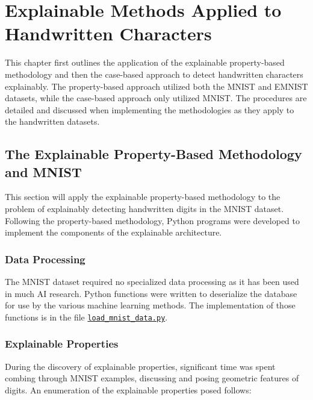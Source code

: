 \chapter{Explainable Methods Applied to Handwritten Characters} \label{ch:handwriting}

This chapter first outlines the application of the explainable property-based
methodology and then the case-based approach to detect handwritten characters
explainably. The property-based approach utilized both the MNIST and EMNIST
datasets, while the case-based approach only utilized MNIST. The
procedures are detailed and discussed when implementing the methodologies as
they apply to the handwritten datasets.

\section{The Explainable Property-Based Methodology and MNIST}

This section will apply the explainable property-based methodology to the
problem of explainably detecting handwritten digits in the MNIST dataset.
Following the property-based methodology, Python programs were developed to
implement the components of the explainable architecture.

\subsection{Data Processing}

The MNIST dataset required no specialized data processing as it has been used in
much AI research. Python functions were written to deserialize the database for
use by the various machine learning methods. The implementation of those
functions is in the file
\href{https://gitlab.com/paulwhitten/2023-svm-xai/-/blob/main/load_mnist_data.py}{\texttt{load\_mnist\_data.py}}\cite{whitten2024icmi_source}.

\subsection{Explainable Properties}

During the discovery of explainable properties, significant time was spent
combing through MNIST examples, discussing and posing geometric features of
digits. An enumeration of the explainable properties posed follows:

